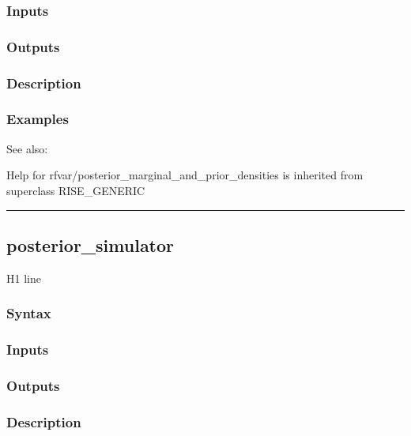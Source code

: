 \documentclass[letterpaper,10pt,english]{sphinxmanual}
\begin{document}
\subsubsection{Inputs}
\label{classes/models/@rfvar/rfvar:id80}

\subsubsection{Outputs}
\label{classes/models/@rfvar/rfvar:id81}

\subsubsection{Description}
\label{classes/models/@rfvar/rfvar:id82}

\subsubsection{Examples}
\label{classes/models/@rfvar/rfvar:id83}
See also:

Help for rfvar/posterior\_marginal\_and\_prior\_densities is inherited from superclass RISE\_GENERIC


\bigskip\hrule{}\bigskip



\subsection{posterior\_simulator}
\label{classes/models/@rfvar/rfvar:posterior-simulator}\label{classes/models/@rfvar/rfvar:id84}
H1 line


\subsubsection{Syntax}
\label{classes/models/@rfvar/rfvar:id85}

\subsubsection{Inputs}
\label{classes/models/@rfvar/rfvar:id86}

\subsubsection{Outputs}
\label{classes/models/@rfvar/rfvar:id87}

\subsubsection{Description}
\label{classes/models/@rfvar/rfvar:id88}
\end{document}
